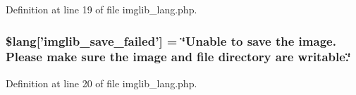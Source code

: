 Definition at line 19 of file imglib\-\_\-lang.\-php.

\hypertarget{imglib__lang_8php_a4d7a99fddc60c97a7327fa0125dea264}{
\subsubsection[{\$lang}]{\setlength{\rightskip}{0pt plus 5cm}\$lang\mbox{[}'imglib\-\_\-save\-\_\-failed'\mbox{]} = \char`\"{}Unable {\bf to} save the image. Please make sure the image {\bf and} file directory are writable.\char`\"{}}}\label{imglib__lang_8php_a4d7a99fddc60c97a7327fa0125dea264}


Definition at line 20 of file imglib\-\_\-lang.\-php.

